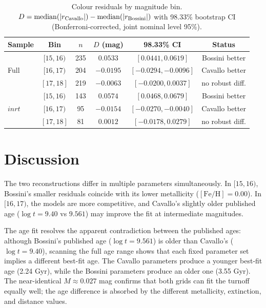 \documentclass{article}
\begin{document}
\begin{table}[t]
  \caption{
    Colour residuals by magnitude bin.
    $D = \mathrm{median}(|r_{\rm Cavallo}|) - \mathrm{median}(|r_{\rm Bossini}|)$
    with 98.33\% bootstrap CI (Bonferroni-corrected, joint nominal level 95\%).
  }
  \label{tab:results}
  \centering
  \small
  \setlength{\tabcolsep}{6pt}
  \begin{tabular}{@{}lccccc@{}}
    \toprule
    Sample & Bin & $n$ & $D$ (mag) & 98.33\% CI & Status \\
    \midrule
    \multirow{3}{*}{Full} & $[15, 16)$ & 235 & $0.0533$ & $[0.0441, 0.0619]$ & Bossini better \\
    & $[16, 17)$ & 204 & $-0.0195$ & $[-0.0294, -0.0096]$ & Cavallo better \\
    & $[17, 18]$ & 219 & $-0.0063$ & $[-0.0200, 0.0037]$ & no robust diff. \\
    \midrule
    \multirow{3}{*}{$inrt$} & $[15, 16)$ & 143 & $0.0574$ & $[0.0468, 0.0679]$ & Bossini better \\
    & $[16, 17)$ & 95 & $-0.0154$ & $[-0.0270, -0.0040]$ & Cavallo better \\
    & $[17, 18]$ & 81 & $0.0012$ & $[-0.0178, 0.0279]$ & no robust diff. \\
    \bottomrule
  \end{tabular}
\end{table}

\section{Discussion}
\label{sec:discussion}

The two reconstructions differ in multiple parameters simultaneously. In $[15,16)$,
Bossini's smaller residuals coincide with its lower metallicity ($[\mathrm{Fe/H}] = 0.00$).
In $[16,17)$, the models are more competitive, and Cavallo's slightly older published age
($\log t = 9.40$ vs $9.561$) may improve the fit at intermediate magnitudes.

The age fit resolves the apparent contradiction between the published ages: although
Bossini's published age ($\log t = 9.561$) is older than Cavallo's ($\log t = 9.40$),
scanning the full age range shows that each fixed parameter set implies a different best-fit
age. The Cavallo parameters produce a younger best-fit age (2.24 Gyr), while the Bossini
parameters produce an older one (3.55 Gyr). The near-identical $M \approx 0.027$ mag
confirms that both grids can fit the turnoff equally well; the age difference is absorbed
by the different metallicity, extinction, and distance values.
\end{document}
